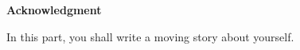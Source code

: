 \begingroup
	\pagestyle{ack}
	
	
	\begin{center}
		\Large{\textbf{Acknowledgment}}
	\end{center}

\noindent In this part, you shall write a moving story about yourself. 

\lipsum[1]

\cleardoublepage
\endgroup






